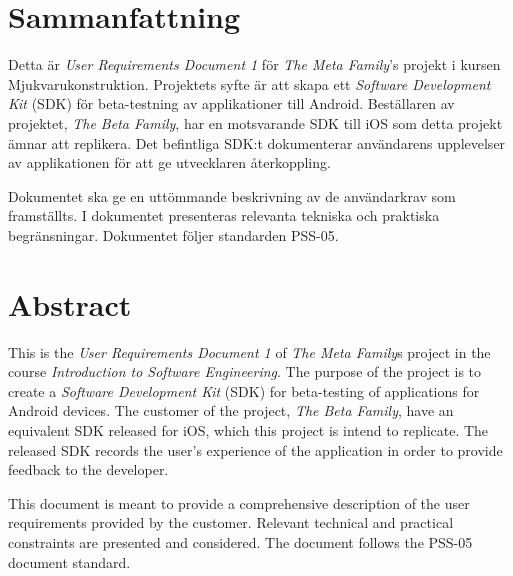 \section*{Sammanfattning} %
Detta är \textit{User Requirements Document 1} för \textit{The Meta Family}'s projekt i kursen Mjukvarukonstruktion. Projektets syfte är att skapa ett \textit{Software Development Kit} (SDK) för beta-testning av applikationer till Android. Beställaren av projektet, \textit{The Beta Family}, har en motsvarande SDK till iOS som detta projekt ämnar att replikera. Det befintliga SDK:t dokumenterar användarens upplevelser av applikationen för att ge utvecklaren återkoppling.

Dokumentet ska ge en uttömmande beskrivning av de användarkrav som framställts. I dokumentet presenteras relevanta tekniska och praktiska begränsningar. Dokumentet följer standarden PSS-05.

\section*{Abstract}
This is the \textit{User Requirements Document 1} of \textit{The Meta Family}s project in the course \textit{Introduction to Software Engineering}. The purpose of the project is to create a \textit{Software Development Kit} (SDK) for beta-testing of applications for Android devices. The customer of the project, \textit{The Beta Family}, have an equivalent SDK released for iOS, which this project is intend to replicate. The released SDK records the user's experience of the application in order to provide feedback to the developer.

This document is meant to provide a comprehensive description of the user requirements provided by the customer. Relevant technical and practical constraints are presented and considered. The document follows the PSS-05 document standard.
